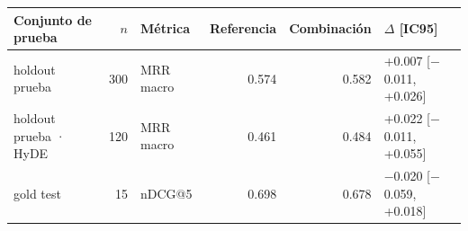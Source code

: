 \begin{tabular}{lrlrrl}
\toprule
Conjunto de prueba & $n$ & Métrica & Referencia & Combinación & $\Delta$ [IC95] \\
\midrule
holdout prueba & 300 & MRR macro & 0.574 & 0.582 & +0.007 [$-$0.011, +0.026] \\
holdout prueba · HyDE & 120 & MRR macro & 0.461 & 0.484 & +0.022 [$-$0.011, +0.055] \\
gold test & 15 & nDCG@5 & 0.698 & 0.678 & $-$0.020 [$-$0.059, +0.018] \\
\bottomrule
\end{tabular}
